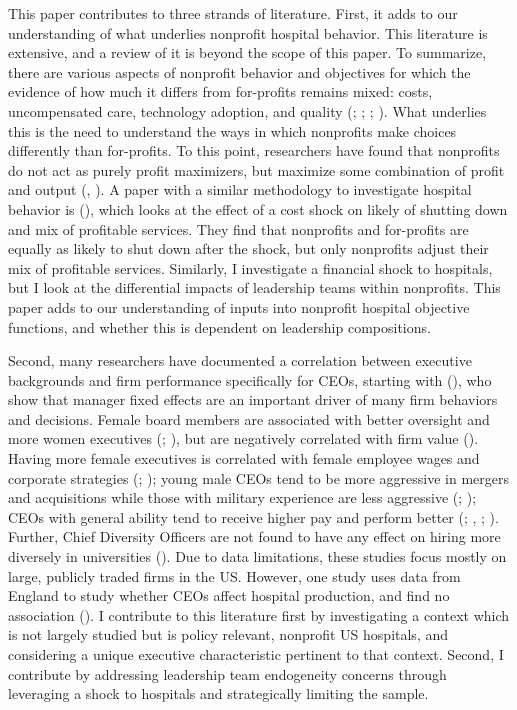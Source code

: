 \documentclass[12pt]{article}
\begin{document}
    This paper contributes to three strands of literature. First, it adds to our understanding of what underlies nonprofit hospital behavior. This literature is extensive, and a review of it is beyond the scope of this paper. To summarize, there are various aspects of nonprofit behavior and objectives for which the evidence of how much it differs from for-profits remains mixed: costs, uncompensated care, technology adoption, and quality (\cite{sloan2000not}; \cite{eggleston2008hospital}; \cite{moscelli2018effect}; \cite{moscone2020public}). What underlies this is the need to understand the ways in which nonprofits make choices differently than for-profits. To this point, researchers have found that nonprofits do not act as purely profit maximizers, but maximize some combination of profit and output (\cite{deneffe2002not}, \cite{chang2011nonprofit}). A paper with a similar methodology to investigate hospital behavior is \citeauthor{chang2011nonprofit} (\citeyear{chang2011nonprofit}), which looks at the effect of a cost shock on likely of shutting down and mix of profitable services. They find that nonprofits and for-profits are equally as likely to shut down after the shock, but only nonprofits adjust their mix of profitable services. Similarly, I investigate a financial shock to hospitals, but I look at the differential impacts of leadership teams within nonprofits. This paper adds to our understanding of inputs into nonprofit hospital objective functions, and whether this is dependent on leadership compositions. 

    Second, many researchers have documented a correlation between executive backgrounds and firm performance specifically for CEOs, starting with \citeauthor{bertrand2003managing} (\citeyear{bertrand2003managing}), who show that manager fixed effects are an important driver of many firm behaviors and decisions. Female board members are associated with better oversight and more women executives (\cite{matsa2011chipping}; \cite{adams2009women}), but are negatively correlated with firm value (\cite{ahern2012changing}). Having more female executives is correlated with female employee wages and corporate strategies (\cite{flabbi2019female}; \cite{matsa2013female}); young male CEOs tend to be more aggressive in mergers and acquisitions while those with military experience are less aggressive (\cite{levi2010deal}; \cite{benmelech2015military}); CEOs with general ability tend to receive higher pay and perform better (\cite{kaplan2012ceo}; \cite{custodio2013generalists}, \cite{adams2018director}; \cite{frydman2019rising}). Further, Chief Diversity Officers are not found to have any effect on hiring more diversely in universities (\cite{bradley2022impact}). Due to data limitations, these studies focus mostly on large, publicly traded firms in the US. However, one study uses data from England to study whether CEOs affect hospital production, and find no association (\cite{janke2019impact}). I contribute to this literature first by investigating a context which is not largely studied but is policy relevant, nonprofit US hospitals, and considering a unique executive characteristic pertinent to that context. Second, I contribute by addressing leadership team endogeneity concerns through leveraging a shock to hospitals and strategically limiting the sample. 
\end{document}
